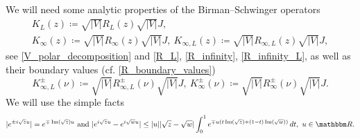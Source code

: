 We will need some analytic properties of the Birman--Schwinger operators
\begin{gather}
  K_L(z)\coloneqq\sqrt{|V|}R_L(z)\sqrt{|V|}J,\label{K_L}\\
  K_\infty(z)\coloneqq\sqrt{|V|}R_\infty(z)\sqrt{|V|}J,\ K_{\infty,L}(z)\coloneqq\sqrt{|V|}R_{\infty,L}(z)\sqrt{|V|}J\label{K_infinity} ,
\end{gather}
see \eqref{V_polar_decomposition} and \eqref{R_L}, \eqref{R_infinity}, \eqref{R_infinity_L},
as well as their boundary values (cf. \eqref{R_boundary_values})
\begin{equation}\label{K_boundary_values}
  K_{\infty,L}^\pm(\nu) \coloneqq \sqrt{|V|}R_{\infty,L}^\pm(\nu)\sqrt{|V|}J,\
  K_\infty^\pm(\nu) \coloneqq \sqrt{|V|}R_\infty^\pm(\nu)\sqrt{|V|}J .
\end{equation}
We will use the simple facts
\begin{equation}\label{exp_properties}
  |e^{\pm i\sqrt{z}u}| = e^{\mp\im(\sqrt{z})u} \ \text{and}\
  |e^{i\sqrt{z}u} - e^{i\sqrt{w}u}| \leq |u| |\sqrt{z}-\sqrt{w}|\int_0^1 e^{\mp u (t \im(\sqrt{z}) + (1-t)\im(\sqrt{w}))}\, dt ,\ u\in\R .
\end{equation}

